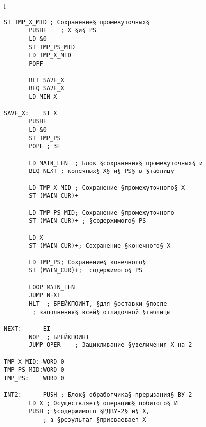 \newpage
\noindent\begin{center}
	\begin{tabular}{l}
		\begin{lstlisting}[basicstyle=\ttfamily]
	   ST TMP_X_MID	; Сохранение§ промежуточных§ 
	   PUSHF	; X §и§ PS
	   LD &0
	   ST TMP_PS_MID
	   LD TMP_X_MID
	   POPF
	
	   BLT SAVE_X
	   BEQ SAVE_X
	   LD MIN_X
		
SAVE_X:	   ST X
	   PUSHF
	   LD &0
	   ST TMP_PS
	   POPF	; 3F
	
	   LD MAIN_LEN	; Блок §сохранения§ промежуточных§ и  
	   BEQ NEXT	; конечных§ X§ и§ PS§ в §таблицу
	
	   LD TMP_X_MID	; Сохранение §промежуточного§ X
	   ST (MAIN_CUR)+
	
	   LD TMP_PS_MID; Сохранение §промежуточного 
	   ST (MAIN_CUR)+ ; §содержимого§ PS
	
	   LD X
	   ST (MAIN_CUR)+; Сохранение §конечного§ X
	
	   LD TMP_PS; Сохранение§ конечного§
	   ST (MAIN_CUR)+;  содержимого§ PS
	
	   LOOP MAIN_LEN	
	   JUMP NEXT
	   HLT	; БРЕЙКПОИНТ, §для §оставки §после 
		; заполнения§ всей§ отладочной §таблицы
		
NEXT:      EI
	   NOP	; БРЕЙКПОИНТ
	   JUMP OPER	; Зацикливание §увеличения X на 2
	
TMP_X_MID: WORD 0
TMP_PS_MID:WORD 0
TMP_PS:	   WORD 0
	
INT2:	   PUSH	; Блок§ обработчика§ прерывания§ ВУ-2
	   LD X	; Осуществляет§ операцию§ побитого§ И  
	   PUSH	; §содержимого §РДВУ-2§ и§ X, 
		   ; а §результат §присваевает X
			
		\end{lstlisting}
	\end{tabular}
\end{center}

